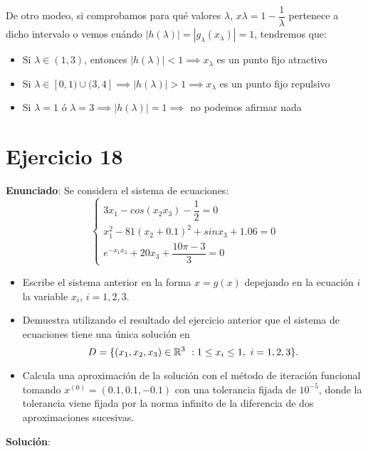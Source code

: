 \documentclass[11pt]{article}
\begin{document}
\begin{itemize}
	De otro modeo, si comprobamos para qué valores $\lambda$, $x\lambda = 1 - \dfrac{1}{\lambda}$ pertenece a dicho intervalo o vemos cuándo $|h(\lambda)| = |g_\lambda(x_\lambda)| = 1$, tendremos que:
	
	\begin{itemize}
	\item Si $\lambda \in (1,3)$, entonces $|h(\lambda)| < 1 \implies x_\lambda$ es un punto fijo atractivo
	\item Si $\lambda \in [0,1) \cup (3,4] \implies |h(\lambda)| > 1 \implies x_\lambda$ es un punto fijo repulsivo
	\item Si $\lambda = 1$ ó $\lambda = 3 \implies |h(\lambda)| = 1 \implies$ no podemos afirmar nada
\end{itemize}
	
\end{itemize}

\section{Ejercicio 18}
\textbf{Enunciado}:
Se considera el sistema de ecuaciones:
\[
\begin{cases}
	3x_1 - cos(x_2x_3) - \dfrac{1}{2} = 0\\
	 x_1^2 -81(x_2+0.1)^2 + sinx_3 +1.06 = 0\\
	 e^{-x_1x_2}+20x_3+\dfrac{10\pi-3}{3} = 0
\end{cases}
\] 
\begin{itemize}
	\item Escribe el sistema anterior en la forma $x=g(x)$ depejando en la ecuación $i$ la variable $x_i$, $i=1,2,3$.
	\item Demuestra utilizando el resultado del ejercicio anterior que el sistema de ecuaciones tiene una única solución en 
	\[
	D = \{(x_1,x_2,x_3) \in \mathbb R^3 \ : \- 1 \leq x_i \leq 1, \ i = 1,2,3\}.
	\]
	
	\item Calcula una aproximación de la solución con el método de iteración funcional tomando $x^{(0)} = (0.1,0.1,-0.1)$ con una tolerancia fijada de $10^{-5}$, donde la tolerancia viene fijada por la norma infinito de la diferencia de dos aproximaciones sucesivas.

\end{itemize}

\textbf{Solución}:
\end{document}
